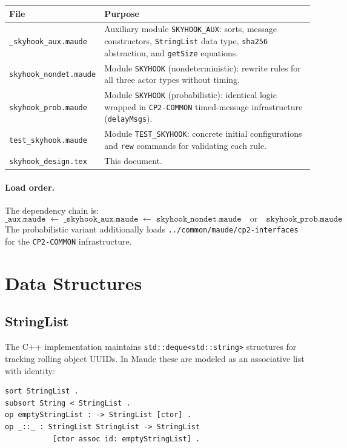 \documentclass[11pt]{article}
\begin{document}
\medskip
\begin{tabular}{@{}lp{9cm}@{}}
\toprule
\textbf{File} & \textbf{Purpose} \\
\midrule
\texttt{\_skyhook\_aux.maude}
  & Auxiliary module \texttt{SKYHOOK\_AUX}: sorts, message constructors,
    \texttt{StringList} data type, \texttt{sha256} abstraction, and
    \texttt{getSize} equations. \\
\texttt{skyhook\_nondet.maude}
  & Module \texttt{SKYHOOK} (nondeterministic): rewrite rules for all
    three actor types without timing. \\
\texttt{skyhook\_prob.maude}
  & Module \texttt{SKYHOOK} (probabilistic): identical logic wrapped in
    \texttt{CP2-COMMON} timed-message infrastructure
    (\texttt{delayMsgs}). \\
\texttt{test\_skyhook.maude}
  & Module \texttt{TEST\_SKYHOOK}: concrete initial configurations and
    \texttt{rew} commands for validating each rule. \\
\texttt{skyhook\_design.tex}
  & This document. \\
\bottomrule
\end{tabular}

\paragraph{Load order.}
The dependency chain is:
\[
  \texttt{\_aux.maude} \;\longleftarrow\;
  \texttt{\_skyhook\_aux.maude} \;\longleftarrow\;
  \texttt{skyhook\_nondet.maude}
  \quad\text{or}\quad
  \texttt{skyhook\_prob.maude}
\]
The probabilistic variant additionally loads
\texttt{../common/maude/cp2-interfaces} for the \texttt{CP2-COMMON}
infrastructure.

\section{Data Structures}\label{sec:data}

\subsection{StringList}

The C++ implementation maintains \texttt{std::deque<std::string>}
structures for tracking rolling object UUIDs.  In Maude these are
modeled as an associative list with identity:

\begin{lstlisting}[caption={StringList sort},label={lst:stringlist}]
sort StringList .
subsort String < StringList .
op emptyStringList : -> StringList [ctor] .
op _::_ : StringList StringList -> StringList
           [ctor assoc id: emptyStringList] .
\end{lstlisting}
\end{document}
